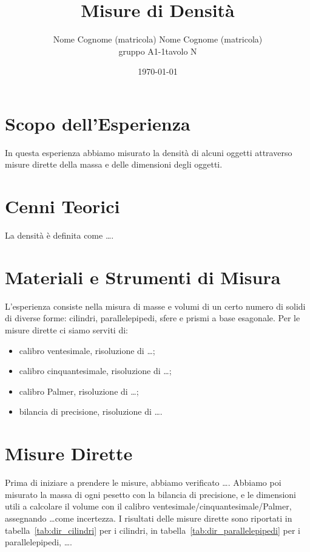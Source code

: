 \documentclass[a4paper]{article}
\title{Misure di Densit\`a}
\author{Nome Cognome (matricola)\quad
        \vspace{3mm}
        Nome Cognome (matricola)\\
         gruppo A1-1\quad tavolo N}
\date{\today}
\begin{document}
\maketitle
\section{Scopo dell'Esperienza}
In questa esperienza abbiamo misurato la densit\`a di alcuni oggetti attraverso misure dirette della massa e delle dimensioni degli oggetti.

\section{Cenni Teorici}
La densit\`a \`e definita come \ldots.

\section{Materiali e Strumenti di Misura}
L'esperienza consiste nella misura di masse e volumi di un certo numero di solidi di diverse forme: cilindri, parallelepipedi, sfere e prismi a base esagonale. Per le misure dirette ci siamo serviti di:
\begin{itemize}
    \item calibro ventesimale, risoluzione di \ldots;
    \item calibro cinquantesimale, risoluzione di \ldots;
    \item calibro Palmer, risoluzione di \ldots;
    \item bilancia di precisione, risoluzione di \ldots.
\end{itemize}

\section{Misure Dirette}

Prima di iniziare a prendere le misure, abbiamo verificato \ldots.
Abbiamo poi misurato la massa di ogni pesetto con la bilancia di precisione, 
e le dimensioni utili a calcolare il volume con il calibro ventesimale/cinquantesimale/Palmer, assegnando \ldots come incertezza. I risultati delle misure dirette sono riportati in tabella~\ref{tab:dir_cilindri} per i cilindri, in tabella~\ref{tab:dir_parallelepipedi} per i parallelepipedi, \ldots.
\end{document}
